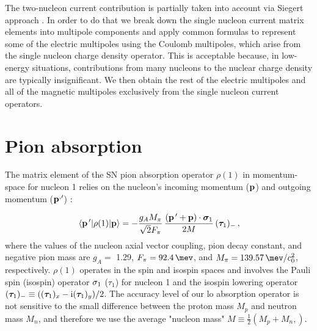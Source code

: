     The two-nucleon current contribution is partially taken into account via Siegert approach \cite{GolakKamad2000_ExplDescr, Golak2005}.
    In order to do that we break down the single nucleon current matrix elements into multipole components and apply common formulas \cite{Golak2005}
    to represent some of the electric multipoles using the Coulomb multipoles, which arise from the single nucleon charge density operator.
    This is acceptable because, in low-energy situations, contributions from many nucleons to the nuclear charge density are typically insignificant.
    We then obtain the rest of the electric multipoles and all of the magnetic multipoles exclusively from the single nucleon current operators.



    \section{Pion absorption}

    The matrix element of the SN pion absorption operator $\rho(1)$ in momentum-space for nucleon 1 relies on the
    nucleon's incoming momentum (${\bf p}$) and outgoing momentum (${\bf p}^{, \prime}$) \cite{BERNARD_1995}:

    \begin{eqnarray}
        \matrixel{{\bf p}^{\, \prime}} 
        {\rho(1)} {{\bf p}} = 
        - \frac{g_A M_\pi}{\sqrt{2} F_\pi } \,
            \frac{ \left( {\bf p}^{\, \prime} +  {\bf p} \right) \cdot {\bm \sigma}_1 } { 2 M } \, 
            ({\bm \tau}_{1})_- \, ,
    \label{rho1}
    \end{eqnarray}
    where the values of the nucleon axial vector coupling, pion decay constant, and negative pion mass are $g_A =$ 1.29, 
    $F_\pi = \SI{92.4}{\mev}$, and $M_\pi = \SI{139.57}{\mev \per \clight\squared}$, respectively. $\rho (1)$ operates in the spin
    and isospin spaces and involves the Pauli spin (isospin) operator ${\bf \sigma}_1$ ($\tau_1$) for nucleon 1 and the isospin lowering operator
    $({\bm \tau}_{1})_- \equiv(({\bm \tau}_1)_x -{\rm i} ({\bm \tau}_1)_y)/2$.
    The accuracy level of our \gls{lo} absorption operator is not sensitive to 
    the small difference between the
    proton mass $M_p$ and neutron mass $M_n$, and therefore we use the average 
    "nucleon mass" $M \equiv \frac12 \left( M_p + M_n , \right)$.



